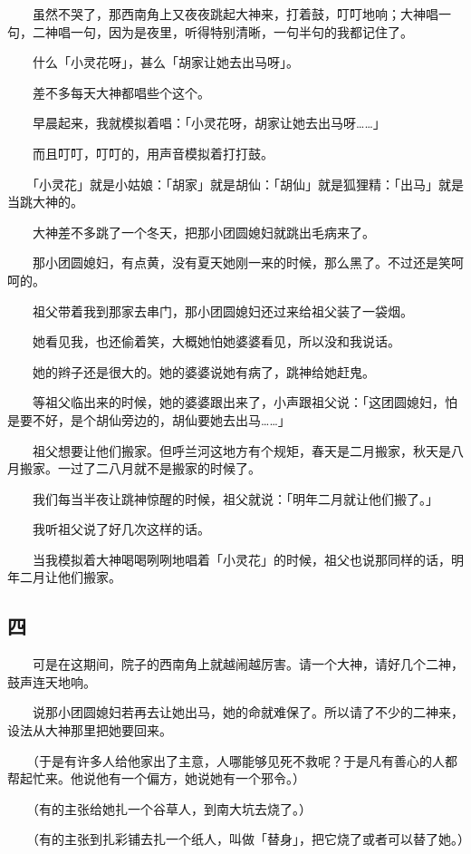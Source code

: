 \documentclass[UTF8]{ctexart}
\begin{document}
　　虽然不哭了，那西南角上又夜夜跳起大神来，打着鼓，叮叮地响；大神唱一句，二神唱一句，因为是夜里，听得特别清晰，一句半句的我都记住了。

　　什么「小灵花呀」，甚么「胡家让她去出马呀」。

　　差不多每天大神都唱些个这个。

　　早晨起来，我就模拟着唱：「小灵花呀，胡家让她去出马呀……」

　　而且叮叮，叮叮的，用声音模拟着打打鼓。

　　「小灵花」就是小姑娘：「胡家」就是胡仙：「胡仙」就是狐狸精：「出马」就是当跳大神的。

　　大神差不多跳了一个冬天，把那小团圆媳妇就跳出毛病来了。

　　那小团圆媳妇，有点黄，没有夏天她刚一来的时候，那么黑了。不过还是笑呵呵的。

　　祖父带着我到那家去串门，那小团圆媳妇还过来给祖父装了一袋烟。

　　她看见我，也还偷着笑，大概她怕她婆婆看见，所以没和我说话。

　　她的辫子还是很大的。她的婆婆说她有病了，跳神给她赶鬼。

　　等祖父临出来的时候，她的婆婆跟出来了，小声跟祖父说：「这团圆媳妇，怕是要不好，是个胡仙旁边的，胡仙要她去出马……」

　　祖父想要让他们搬家。但呼兰河这地方有个规矩，春天是二月搬家，秋天是八月搬家。一过了二八月就不是搬家的时候了。

　　我们每当半夜让跳神惊醒的时候，祖父就说：「明年二月就让他们搬了。」

　　我听祖父说了好几次这样的话。

　　当我模拟着大神喝喝咧咧地唱着「小灵花」的时候，祖父也说那同样的话，明年二月让他们搬家。

\subsection{四}

　　可是在这期间，院子的西南角上就越闹越厉害。请一个大神，请好几个二神，鼓声连天地响。

　　说那小团圆媳妇若再去让她出马，她的命就难保了。所以请了不少的二神来，设法从大神那里把她要回来。

　　（于是有许多人给他家出了主意，人哪能够见死不救呢？于是凡有善心的人都帮起忙来。他说他有一个偏方，她说她有一个邪令。）

　　（有的主张给她扎一个谷草人，到南大坑去烧了。）

　　（有的主张到扎彩铺去扎一个纸人，叫做「替身」，把它烧了或者可以替了她。）
\end{document}
